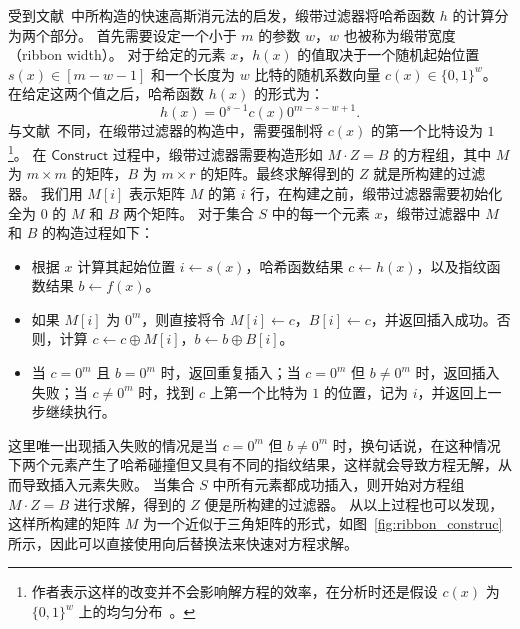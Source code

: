 受到文献~\cite{dietzfelbinger2019Efficient}中所构造的快速高斯消元法的启发，缎带过滤器将哈希函数 $h$ 的计算分为两个部分。
首先需要设定一个小于 $m$ 的参数 $w$，$w$ 也被称为缎带宽度 （ribbon width）。
对于给定的元素 $x$，$h(x)$ 的值取决于一个随机起始位置 $s(x)\in [m-w-1]$ 和一个长度为 $w$ 比特的随机系数向量 $c(x) \in \{0,1\}^w$。
在给定这两个值之后，哈希函数 $h(x)$ 的形式为：
\begin{equation}
  h(x) = 0^{s-1}c(x)0^{m-s-w+1}.
\end{equation}
与文献~\cite{dillinger2021ribbon}不同，在缎带过滤器的构造中，需要强制将 $c(x)$ 的第一个比特设为 $1$\footnote{作者表示这样的改变并不会影响解方程的效率，在分析时还是假设 $c(x)$ 为 $\{0,1\}^w$ 上的均匀分布~\cite{dillinger2021ribbon}。}。
在 $\mathsf{Construct}$ 过程中，缎带过滤器需要构造形如 $M \cdot Z = B$ 的方程组，其中 $M$ 为 $m\times m$ 的矩阵，$B$ 为 $m\times r$ 的矩阵。最终求解得到的 $Z$ 就是所构建的过滤器。
我们用 $M[i]$ 表示矩阵 $M$ 的第 $i$ 行，在构建之前，缎带过滤器需要初始化全为 $0$ 的 $M$ 和 $B$ 两个矩阵。
对于集合 $S$ 中的每一个元素 $x$，缎带过滤器中 $M$ 和 $B$ 的构造过程如下：
\begin{itemize}
  \item 根据 $x$ 计算其起始位置 $i\gets s(x)$，哈希函数结果 $c \gets h(x)$，以及指纹函数结果 $b \gets f(x)$。
  \item 如果 $M[i]$ 为 $0^{m}$，则直接将令 $M[i] \gets c$，$B[i] \gets c$，并返回插入成功。否则，计算 $c \gets c \oplus M[i]$，$b \gets b \oplus B[i]$。
  \item 当 $c=0^{m}$ 且 $b = 0^{m}$ 时，返回重复插入；当 $c=0^{m}$ 但 $b \neq 0^{m}$ 时，返回插入失败；当 $c\neq 0^{m}$ 时，找到 $c$ 上第一个比特为 $1$ 的位置，记为 $i$，并返回上一步继续执行。
\end{itemize}
这里唯一出现插入失败的情况是当 $c=0^{m}$ 但 $b\neq 0^{m}$ 时，换句话说，在这种情况下两个元素产生了哈希碰撞但又具有不同的指纹结果，这样就会导致方程无解，从而导致插入元素失败。
当集合 $S$ 中所有元素都成功插入，则开始对方程组 $M \cdot Z = B$ 进行求解，得到的 $Z$ 便是所构建的过滤器。
从以上过程也可以发现，这样所构建的矩阵 $M$ 为一个近似于三角矩阵的形式，如图~\ref{fig:ribbon_construc}所示，因此可以直接使用向后替换法来快速对方程求解。

